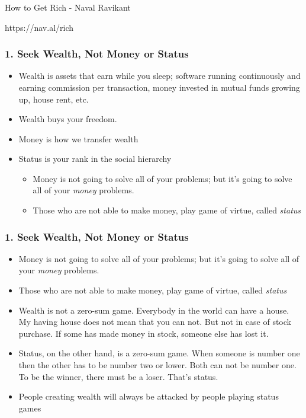 \begin{frame}[fragile]\frametitle{}
\begin{center}
{\Large How to Get Rich - Naval Ravikant}

{\small https://nav.al/rich}

\end{center}
\end{frame}

\begin{frame}[fragile]
\frametitle{1. Seek Wealth, Not Money or Status}
\begin{itemize}
\item Wealth is assets that earn while you sleep; software running continuously and earning commission per transaction, money invested in mutual funds growing up, house rent, etc.
\item Wealth buys your freedom.

\item Money is how we transfer wealth
\item Status is your rank in the social hierarchy
\begin{itemize}
\item Money is not going to solve all of your problems; but it’s going to solve all of your {\it money} problems.
\item Those who are not able to make money, play game of virtue, called {\it status}
\end{itemize}
\end{itemize}
\end{frame}


\begin{frame}[fragile]
\frametitle{1. Seek Wealth, Not Money or Status}
\begin{itemize}
\item Money is not going to solve all of your problems; but it’s going to solve all of your {\it money} problems.
\item Those who are not able to make money, play game of virtue, called {\it status}
\item Wealth is not a zero-sum game. Everybody in the world can have a house. My having house does not mean that you can not. But not in case of stock purchase. If some has made money in stock, someone else has lost it.
\item Status, on the other hand, is a zero-sum game. When someone is number one then the other has to be number two or lower. Both can not be number one. To be the winner, there must be a loser. That's status.
\item People creating wealth will always be attacked by people playing status games
\end{itemize}


\end{frame}

